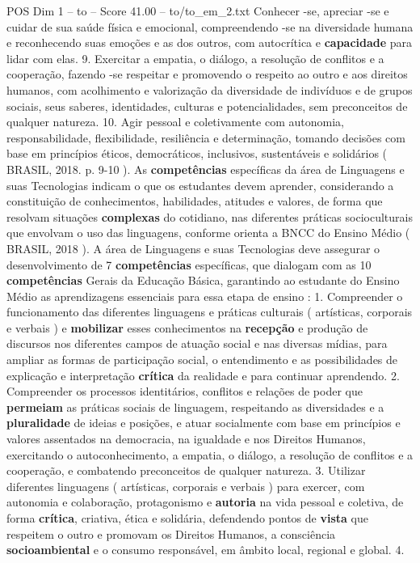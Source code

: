 \begin{textsample}{POS Dim 1 – to – Score 41.00 – to/to\_em\_2.txt}
Conhecer -se, apreciar -se e cuidar de sua saúde física e emocional, compreendendo -se na diversidade humana e reconhecendo suas emoções e as dos outros, com autocrítica e \textbf{capacidade} para lidar com elas. 9.
Exercitar a empatia, o diálogo, a resolução de conflitos e a cooperação, fazendo -se respeitar e promovendo o respeito ao outro e aos direitos humanos, com acolhimento e valorização da diversidade de indivíduos e de grupos sociais, seus saberes, identidades, culturas e potencialidades, sem preconceitos de qualquer natureza. 10.
Agir pessoal e coletivamente com autonomia, responsabilidade, flexibilidade, resiliência e determinação, tomando decisões com base em princípios éticos, democráticos, inclusivos, sustentáveis e solidários ( BRASIL, 2018. p. 9-10 ).
As \textbf{competências} específicas da área de Linguagens e suas Tecnologias indicam o que os estudantes devem aprender, considerando a constituição de conhecimentos, habilidades, atitudes e valores, de forma que resolvam situações \textbf{complexas} do cotidiano, nas diferentes práticas socioculturais que envolvam o uso das linguagens, conforme orienta a BNCC do Ensino Médio ( BRASIL, 2018 ).
A área de Linguagens e suas Tecnologias deve assegurar o desenvolvimento de 7 \textbf{competências} específicas, que dialogam com as 10 \textbf{competências} Gerais da Educação Básica, garantindo ao estudante do Ensino Médio as aprendizagens essenciais para essa etapa de ensino : 1.
Compreender o funcionamento das diferentes linguagens e práticas culturais ( artísticas, corporais e verbais ) e \textbf{mobilizar} esses conhecimentos na \textbf{recepção} e produção de discursos nos diferentes campos de atuação social e nas diversas mídias, para ampliar as formas de participação social, o entendimento e as possibilidades de explicação e interpretação \textbf{crítica} da realidade e para continuar aprendendo. 2.
Compreender os processos identitários, conflitos e relações de poder que \textbf{permeiam} as práticas sociais de linguagem, respeitando as diversidades e a \textbf{pluralidade} de ideias e posições, e atuar socialmente com base em princípios e valores assentados na democracia, na igualdade e nos Direitos Humanos, exercitando o autoconhecimento, a empatia, o diálogo, a resolução de conflitos e a cooperação, e combatendo preconceitos de qualquer natureza. 3.
Utilizar diferentes linguagens ( artísticas, corporais e verbais ) para exercer, com autonomia e colaboração, protagonismo e \textbf{autoria} na vida pessoal e coletiva, de forma \textbf{crítica}, criativa, ética e solidária, defendendo pontos de \textbf{vista} que respeitem o outro e promovam os Direitos Humanos, a consciência \textbf{socioambiental} e o consumo responsável, em âmbito local, regional e global. 4.

\end{textsample}
